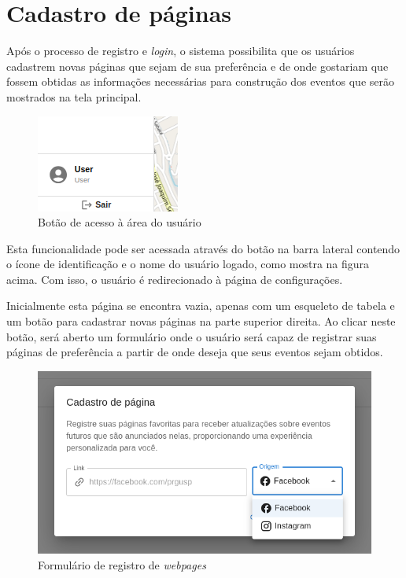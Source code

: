 \section{Cadastro de páginas}

Após o processo de registro e \textit{login}, o sistema possibilita que os
usuários cadastrem novas páginas que sejam de sua preferência e de onde
gostariam que fossem obtidas as informações necessárias para construção dos
eventos que serão mostrados na tela principal.

\begin{figure}[h]
    \centering
    \includegraphics[scale=.8]{figuras/userArea.png}
    \caption{Botão de acesso à área do usuário}
\end{figure}

Esta funcionalidade pode ser acessada através do botão na barra lateral
contendo o ícone de identificação e o nome do usuário logado, como mostra na
figura acima. Com isso, o usuário é redirecionado à página de configurações.

Inicialmente esta página se encontra vazia, apenas com um esqueleto de tabela e
um botão para cadastrar novas páginas na parte superior direita. Ao clicar
neste botão, será aberto um formulário onde o usuário será capaz de registrar
suas páginas de preferência a partir de onde deseja que seus eventos sejam
obtidos.

\begin{figure}[h]
    \centering
    \includegraphics[scale=.5]{figuras/webpageRegisterModal.png}
    \caption{Formulário de registro de \textit{webpages}}
\end{figure}

